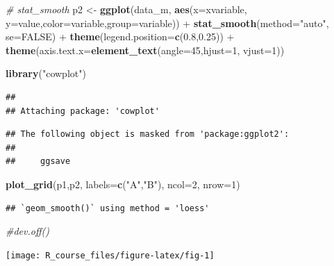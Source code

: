 \documentclass[]{article}
\newenvironment{Shaded}{\begin{snugshade}}{\end{snugshade}}
\newcommand{\KeywordTok}[1]{\textcolor[rgb]{0.13,0.29,0.53}{\textbf{{#1}}}}
\newcommand{\DataTypeTok}[1]{\textcolor[rgb]{0.13,0.29,0.53}{{#1}}}
\newcommand{\DecValTok}[1]{\textcolor[rgb]{0.00,0.00,0.81}{{#1}}}
\newcommand{\FloatTok}[1]{\textcolor[rgb]{0.00,0.00,0.81}{{#1}}}
\newcommand{\StringTok}[1]{\textcolor[rgb]{0.31,0.60,0.02}{{#1}}}
\newcommand{\CommentTok}[1]{\textcolor[rgb]{0.56,0.35,0.01}{\textit{{#1}}}}
\newcommand{\OtherTok}[1]{\textcolor[rgb]{0.56,0.35,0.01}{{#1}}}
\newcommand{\NormalTok}[1]{{#1}}
\numberwithin{figure}{section}
\numberwithin{table}{section}
\theoremstyle{definition}
\theoremstyle{definition}
\theoremstyle{definition}
\theoremstyle{remark}
\begin{document}
\begin{Shaded}
\begin{Highlighting}[]
\CommentTok{# stat_smooth}
\NormalTok{p2 <-}\StringTok{ }\KeywordTok{ggplot}\NormalTok{(data_m, }\KeywordTok{aes}\NormalTok{(}\DataTypeTok{x=}\NormalTok{xvariable, }\DataTypeTok{y=}\NormalTok{value,}\DataTypeTok{color=}\NormalTok{variable,}\DataTypeTok{group=}\NormalTok{variable)) +}\StringTok{ }
\StringTok{     }\KeywordTok{stat_smooth}\NormalTok{(}\DataTypeTok{method=}\StringTok{"auto"}\NormalTok{, }\DataTypeTok{se=}\OtherTok{FALSE}\NormalTok{) +}\StringTok{ }\KeywordTok{theme}\NormalTok{(}\DataTypeTok{legend.position=}\KeywordTok{c}\NormalTok{(}\FloatTok{0.8}\NormalTok{,}\FloatTok{0.25}\NormalTok{)) +}
\StringTok{     }\KeywordTok{theme}\NormalTok{(}\DataTypeTok{axis.text.x=}\KeywordTok{element_text}\NormalTok{(}\DataTypeTok{angle=}\DecValTok{45}\NormalTok{,}\DataTypeTok{hjust=}\DecValTok{1}\NormalTok{, }\DataTypeTok{vjust=}\DecValTok{1}\NormalTok{))}
     
\KeywordTok{library}\NormalTok{(}\StringTok{"cowplot"}\NormalTok{)}
\end{Highlighting}
\end{Shaded}

\begin{verbatim}
## 
## Attaching package: 'cowplot'
\end{verbatim}

\begin{verbatim}
## The following object is masked from 'package:ggplot2':
## 
##     ggsave
\end{verbatim}

\begin{Shaded}
\begin{Highlighting}[]
\KeywordTok{plot_grid}\NormalTok{(p1,p2, }\DataTypeTok{labels=}\KeywordTok{c}\NormalTok{(}\StringTok{"A"}\NormalTok{,}\StringTok{"B"}\NormalTok{), }\DataTypeTok{ncol=}\DecValTok{2}\NormalTok{, }\DataTypeTok{nrow=}\DecValTok{1}\NormalTok{)}
\end{Highlighting}
\end{Shaded}

\begin{verbatim}
## `geom_smooth()` using method = 'loess'
\end{verbatim}

\begin{Shaded}
\begin{Highlighting}[]
\CommentTok{#dev.off()}
\end{Highlighting}
\end{Shaded}

\begin{center}\texttt{[image: R\_course\_files/figure-latex/fig-1]} \end{center}
\end{document}
